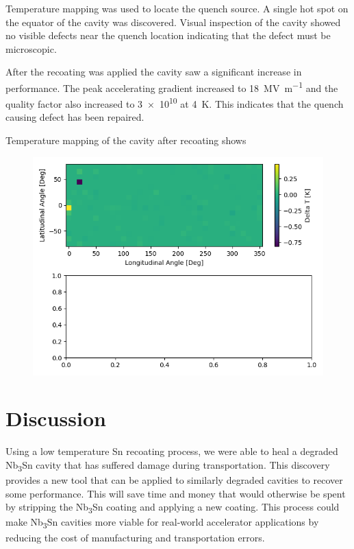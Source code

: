 \documentclass[]{revtex4-2}
\begin{document}
Temperature mapping was used to locate the quench source. A single hot spot on the equator of the cavity was discovered. Visual inspection of the cavity showed no visible defects near the quench location indicating that the defect must be microscopic.

After the recoating was applied the cavity saw a significant increase in performance. The peak accelerating gradient increased to \qty{18}{\mega\volt\per\meter} and the quality factor also increased to \num{3e10} at \qty{4}{\kelvin}. This indicates that the quench causing defect has been repaired. 

Temperature mapping of the cavity after recoating shows







\begin{figure}[h!]%
    \centering%
    \includegraphics{./figures/TMAP.png}%
    \caption{}%
    \label{fig:VTS}%
\end{figure}


\section{Discussion}
\label{sec:Discussion}

Using a low temperature Sn recoating process, we were able to heal a degraded Nb\textsubscript{3}Sn cavity that has suffered damage during transportation. This discovery provides a new tool that can be applied to similarly degraded cavities to recover some performance. This will save time and money that would otherwise be spent by stripping the Nb\textsubscript{3}Sn coating and applying a new coating. This process could make Nb\textsubscript{3}Sn cavities more viable for real-world accelerator applications by reducing the cost of manufacturing and transportation errors.





\end{document}
